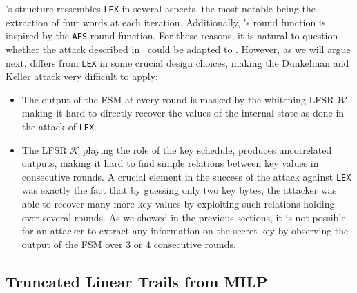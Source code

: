 \coolName{}'s structure ressembles {\tt LEX} in several aspects, the most notable being the extraction of four words at each iteration. Additionally, \coolName{}'s round function is inspired by the {\tt AES} round function. For these reasons, it is natural to question whether the attack described in~\cite{AC:DunKel08b} could be adapted to \coolName{}. However, as we will argue next,  \coolName{} differs from {\tt LEX} in some crucial design choices, making the Dunkelman and Keller attack very difficult to apply:

\begin{itemize}
\item The output of the FSM at every round is masked by the whitening LFSR $\mathcal{W}$ making it hard to directly recover the values of the internal state as done in the attack of {\tt LEX}.
\item The LFSR $\mathcal{K}$ playing the role of the key schedule, produces uncorrelated outputs, making it hard to find simple relations between key values in consecutive rounds. A crucial element in the success of the attack against {\tt LEX} was exactly the fact that by guessing only two key bytes, the attacker was able to recover many more key values by exploiting such relations holding over several rounds. As we showed in the previous sections, it is not possible for an attacker to extract any information on the secret key by observing the output of the FSM over 3 or 4 consecutive rounds. 
\end{itemize}


\subsection{Truncated Linear Trails from MILP}
\label{sec:milp}


